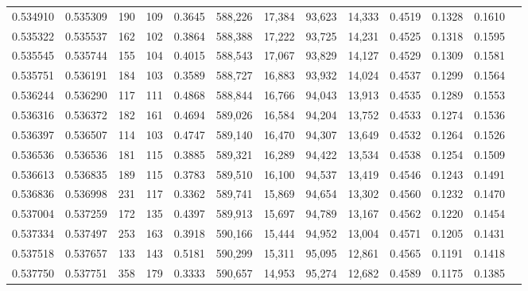 \begin{tabular}{rrrrrrrrrrrrr}
0.534910 & 0.535309 &   190 &   109 &                                     0.3645 & 588,226 &  17,384 &  93,623 &  14,333 & 0.4519 & 0.1328 & 0.1610 \\
0.535322 & 0.535537 &   162 &   102 &                                     0.3864 & 588,388 &  17,222 &  93,725 &  14,231 & 0.4525 & 0.1318 & 0.1595 \\
0.535545 & 0.535744 &   155 &   104 &                                     0.4015 & 588,543 &  17,067 &  93,829 &  14,127 & 0.4529 & 0.1309 & 0.1581 \\
0.535751 & 0.536191 &   184 &   103 &                                     0.3589 & 588,727 &  16,883 &  93,932 &  14,024 & 0.4537 & 0.1299 & 0.1564 \\
0.536244 & 0.536290 &   117 &   111 &                                     0.4868 & 588,844 &  16,766 &  94,043 &  13,913 & 0.4535 & 0.1289 & 0.1553 \\
0.536316 & 0.536372 &   182 &   161 &                                     0.4694 & 589,026 &  16,584 &  94,204 &  13,752 & 0.4533 & 0.1274 & 0.1536 \\
0.536397 & 0.536507 &   114 &   103 &                                     0.4747 & 589,140 &  16,470 &  94,307 &  13,649 & 0.4532 & 0.1264 & 0.1526 \\
0.536536 & 0.536536 &   181 &   115 &                                     0.3885 & 589,321 &  16,289 &  94,422 &  13,534 & 0.4538 & 0.1254 & 0.1509 \\
0.536613 & 0.536835 &   189 &   115 &                                     0.3783 & 589,510 &  16,100 &  94,537 &  13,419 & 0.4546 & 0.1243 & 0.1491 \\
0.536836 & 0.536998 &   231 &   117 &                                     0.3362 & 589,741 &  15,869 &  94,654 &  13,302 & 0.4560 & 0.1232 & 0.1470 \\
0.537004 & 0.537259 &   172 &   135 &                                     0.4397 & 589,913 &  15,697 &  94,789 &  13,167 & 0.4562 & 0.1220 & 0.1454 \\
0.537334 & 0.537497 &   253 &   163 &                                     0.3918 & 590,166 &  15,444 &  94,952 &  13,004 & 0.4571 & 0.1205 & 0.1431 \\
0.537518 & 0.537657 &   133 &   143 &                                     0.5181 & 590,299 &  15,311 &  95,095 &  12,861 & 0.4565 & 0.1191 & 0.1418 \\
0.537750 & 0.537751 &   358 &   179 &                                     0.3333 & 590,657 &  14,953 &  95,274 &  12,682 & 0.4589 & 0.1175 & 0.1385 \\

\end{tabular}
